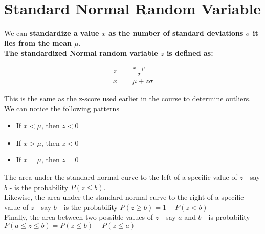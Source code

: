 \section{Standard Normal Random Variable}

We can \bf{standardize} a value $x$ as the number of standard deviations $\sigma$ it lies from the mean $\mu$. \\

The \bf{standardized Normal random variable} $z$ is defined as:

$$
    \begin{aligned}
        z &= \frac{x-\mu}{\sigma}\\
        x &= \mu + z\sigma
    \end{aligned}
$$

This is the same as the z-score used earlier in the course to determine outliers. We can notice the following patterns

\begin{itemize}
    \item If $x < \mu$, then $z < 0$
    \item If $x > \mu$, then $z < 0$
    \item If $x = \mu$, then $z=0$
\end{itemize}

The area under the standard normal curve to the left of a specific value of $z$ - say $b$ - is the probability $P(z \le b)$.\\

Likewise, the area under the standard normal curve to the right of a specific value of $z$ - say $b$ - is the probability $P(z \ge b) = 1 - P(z < b)$\\

Finally, the area between two possible values of $z$ - say $a$ and $b$ - is probability $P(a \le z \le b) = P(z \le b) - P(z \le a)$